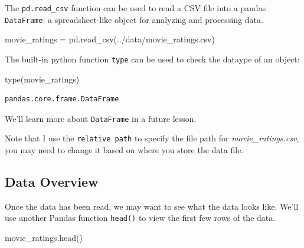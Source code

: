 \documentclass[
  letterpaper,
  DIV=11,
  numbers=noendperiod]{scrreprt}
\newenvironment{Shaded}{\begin{snugshade}}{\end{snugshade}}
\newcommand{\BuiltInTok}[1]{\textcolor[rgb]{0.00,0.23,0.31}{#1}}
\newcommand{\NormalTok}[1]{\textcolor[rgb]{0.00,0.23,0.31}{#1}}
\newcommand{\OperatorTok}[1]{\textcolor[rgb]{0.37,0.37,0.37}{#1}}
\newcommand{\StringTok}[1]{\textcolor[rgb]{0.13,0.47,0.30}{#1}}
\begin{document}
The \texttt{pd.read\_csv} function can be used to read a CSV file into a
pandas \texttt{DataFrame}: a spreadsheet-like object for analyzing and
processing data.

\begin{Shaded}
\begin{Highlighting}[]
\NormalTok{movie\_ratings }\OperatorTok{=}\NormalTok{ pd.read\_csv(}\StringTok{\textquotesingle{}../data/movie\_ratings.csv\textquotesingle{}}\NormalTok{)}
\end{Highlighting}
\end{Shaded}

The built-in python function \texttt{type} can be used to check the
dataype of an object:

\begin{Shaded}
\begin{Highlighting}[]
\BuiltInTok{type}\NormalTok{(movie\_ratings)}
\end{Highlighting}
\end{Shaded}

\begin{verbatim}
pandas.core.frame.DataFrame
\end{verbatim}

We'll learn more about \texttt{DataFrame} in a future lesson.

Note that I use the \texttt{relative\ path} to specify the file path for
\emph{movie\_ratings.csv}, you may need to change it based on where you
store the data file.

\hypertarget{data-overview}{%
\subsection{Data Overview}\label{data-overview}}

Once the data has been read, we may want to see what the data looks
like. We'll use another Pandas function \texttt{head()} to view the
first few rows of the data.

\begin{Shaded}
\begin{Highlighting}[]
\NormalTok{movie\_ratings.head()}
\end{Highlighting}
\end{Shaded}
\end{document}
